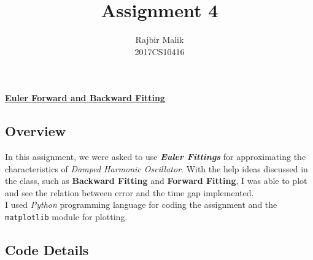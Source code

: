 \documentclass{article}
\title{Assignment 4}
\author{Rajbir Malik \\ 2017CS10416}
\begin{document}
    
    \maketitle
    
    \begin{center}
    \Large{\underline{\textbf{Euler Forward and Backward Fitting}}}
    \end{center}
    \subsection*{Overview}
    In this assignment, we were asked to use \textbf{\emph{Euler Fittings}} for approximating the characteristics of \textit{Damped Harmonic Oscillator}. With the help ideas discussed in the class, such as \textbf{Backward Fitting} and \textbf{Forward Fitting}, I was able to plot and see the relation between error and the time gap implemented.\\I used \emph{Python} programming language for coding the assignment and the \texttt{matplotlib} module for plotting.
    
    \pagebreak
    \subsection*{Code Details}
    
\end{document}

